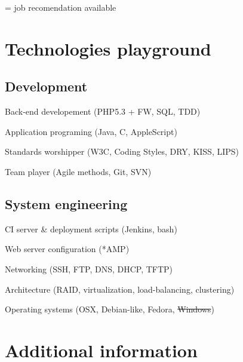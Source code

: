 \documentclass[letterpaper]{article}
\renewenvironment{itemize}{
    \begin{list}{}{
        \setlength{\leftmargin}{1.5em}
    }
}{
    \end{list}
}
\begin{document}
        \vfill
        \begin{flushright}
            \small{ = job recomendation available}
        \end{flushright}
        
    \section*{Technologies playground}
        
        \subsection*{Development}
            
            \begin{itemize}
                \item Back-end developement (PHP5.3 + FW, SQL, TDD)
                \item Application programing (Java, C, AppleScript)
                \item Standards worshipper (W3C, Coding Styles, DRY, KISS, LIPS)
                \item Team player (Agile methods, Git, SVN)
            \end{itemize}
            
        \subsection*{System engineering}
            
            \begin{itemize}
                \item CI server \& deployment scripts (Jenkins, bash) 
                \item Web server configuration (*AMP)
                \item Networking (SSH, FTP, DNS, DHCP, TFTP)
                \item Architecture (RAID, virtualization, load-balancing, clustering)
                \item Operating systems (OSX, Debian-like, Fedora, \sout{Windows})
            \end{itemize}
            
    \section*{Additional information}
        
\end{document}
